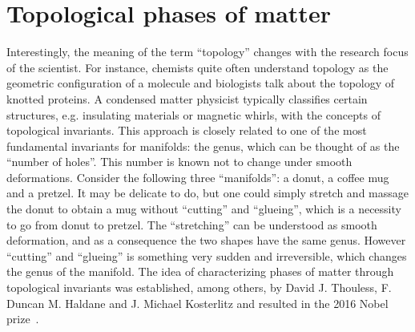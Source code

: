 %
%
\chapter{Topological phases of matter}
\label{ch:topological_phases_of_matter}
%
%
Interestingly, the meaning of the term ``topology'' changes with the research focus of the scientist.
For instance, chemists quite often understand topology as the geometric configuration of a molecule and biologists talk about the topology of knotted proteins.
A condensed matter physicist typically classifies certain structures, e.g. insulating materials or magnetic whirls, with the concepts of topological invariants.
This approach is closely related to one of the most fundamental invariants for manifolds: the genus, which can be thought of as the ``number of holes''.
This number is known not to change under smooth deformations.
Consider the following three ``manifolds'': a donut, a coffee mug and a pretzel.
It may be delicate to do, but one could simply stretch and massage the donut to obtain a mug without ``cutting'' and ``glueing'', which is a necessity to go from donut to pretzel.
The ``stretching'' can be understood as smooth deformation, and as a consequence the two shapes have the same genus.
However ``cutting'' and ``glueing'' is something very sudden and irreversible, which changes the genus of the manifold.
The idea of characterizing phases of matter through topological invariants was established, among others, by David J. Thouless, F. Duncan M. Haldane and J. Michael Kosterlitz and resulted in the 2016 Nobel prize~\cite{NP2016}.

